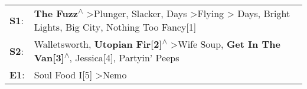\begin{supertabular}{p{0.03\textwidth}p{0.92\textwidth}}
 \textbf{S1}:  &  \textbf{The Fuzz\textsuperscript{$\wedge$}} \textgreater \enspace Plunger\textsuperscript{}, \enspace Slacker\textsuperscript{},  Days\textsuperscript{} \textgreater \enspace Flying\textsuperscript{} \textgreater {} Days\textsuperscript{}, \enspace Bright Lights, Big City\textsuperscript{}, \enspace Nothing Too Fancy[1]\textsuperscript{}  \enspace  \\
 \textbf{S2}:  &                                                                            Walletsworth\textsuperscript{}, \enspace \textbf{Utopian Fir[2]\textsuperscript{$\wedge$}} \textgreater \enspace Wife Soup\textsuperscript{}, \enspace \textbf{Get In The Van[3]\textsuperscript{$\wedge$}}, \enspace Jessica[4]\textsuperscript{}, \enspace Partyin' Peeps\textsuperscript{}  \enspace  \\
 \textbf{E1}:  &                                                                                                                                                                                                                                                                                            Soul Food I[5]\textsuperscript{} \textgreater \enspace Nemo\textsuperscript{}  \enspace  \\
\end{supertabular}
